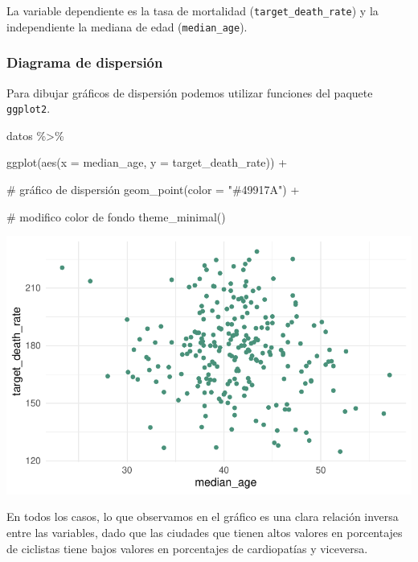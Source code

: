 \documentclass[
  letterpaper,
  DIV=11,
  numbers=noendperiod]{scrartcl}
\newenvironment{Shaded}{\begin{snugshade}}{\end{snugshade}}
\newcommand{\AttributeTok}[1]{\textcolor[rgb]{0.40,0.45,0.13}{#1}}
\newcommand{\CommentTok}[1]{\textcolor[rgb]{0.37,0.37,0.37}{#1}}
\newcommand{\FunctionTok}[1]{\textcolor[rgb]{0.28,0.35,0.67}{#1}}
\newcommand{\NormalTok}[1]{\textcolor[rgb]{0.00,0.23,0.31}{#1}}
\newcommand{\SpecialCharTok}[1]{\textcolor[rgb]{0.37,0.37,0.37}{#1}}
\newcommand{\StringTok}[1]{\textcolor[rgb]{0.13,0.47,0.30}{#1}}
\begin{document}
La variable dependiente es la tasa de mortalidad
(\texttt{target\_death\_rate}) y la independiente la mediana de edad
(\texttt{median\_age}).

\subsubsection{Diagrama de dispersión}\label{diagrama-de-dispersiuxf3n}

Para dibujar gráficos de dispersión podemos utilizar funciones del
paquete \texttt{ggplot2}.

\begin{Shaded}
\begin{Highlighting}[]
\NormalTok{datos }\SpecialCharTok{\%\textgreater{}\%} 
  
  \FunctionTok{ggplot}\NormalTok{(}\FunctionTok{aes}\NormalTok{(}\AttributeTok{x =}\NormalTok{ median\_age, }\AttributeTok{y =}\NormalTok{ target\_death\_rate)) }\SpecialCharTok{+}
  
  \CommentTok{\# gráfico de dispersión}
  \FunctionTok{geom\_point}\NormalTok{(}\AttributeTok{color =} \StringTok{"\#49917A"}\NormalTok{) }\SpecialCharTok{+} 
  
  \CommentTok{\# modifico color de fondo}
  \FunctionTok{theme\_minimal}\NormalTok{()}
\end{Highlighting}
\end{Shaded}

\begin{center}
\includegraphics{index_files/figure-pdf/unnamed-chunk-10-1.pdf}
\end{center}

En todos los casos, lo que observamos en el gráfico es una clara
relación inversa entre las variables, dado que las ciudades que tienen
altos valores en porcentajes de ciclistas tiene bajos valores en
porcentajes de cardiopatías y viceversa.
\end{document}
